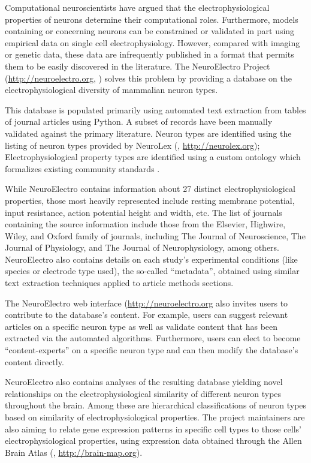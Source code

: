 \documentclass[12pt]{article}
\begin{document}
Computational neuroscientists have argued that the electrophysiological properties of neurons determine their computational roles.
Furthermore, models containing or concerning neurons can be constrained or validated in part using empirical data on single cell electrophysiology.
However, compared with imaging or genetic data, these data are infrequently published in a format that permits them to be easily discovered in the literature.
The NeuroElectro Project (\url{http://neuroelectro.org}, \cite{neuroelectro_2013}) solves this problem by providing a database on the electrophysiological diversity of mammalian neuron types.

This database is populated primarily using automated text extraction from tables of journal articles using Python.
A subset of records have been manually validated against the primary literature.
Neuron types are identified using the listing of neuron types provided by NeuroLex (\cite{larson_neurolex.org:_2013,hamilton_ontological_2012}, \url{http://neurolex.org});
Electrophysiological property types are identified using a custom ontology which formalizes existing community standards \cite{ascoli_petilla_2008}.

While NeuroElectro contains information about 27 distinct electrophysiological properties, those most heavily represented include resting membrane potential, input resistance, action potential height and width, etc.
The list of journals containing the source information include those from the Elsevier, Highwire, Wiley, and Oxford family of journals, including The Journal of Neuroscience, The Journal of Physiology, and The Journal of Neurophysiology, among others.
NeuroElectro also contains details on each study’s experimental conditions (like species or electrode type used), the so-called ``metadata'', obtained using similar text extraction techniques applied to article methods sections.

The NeuroElectro web interface (\url{http://neuroelectro.org} also invites users to contribute to the database’s content.
For example, users can suggest relevant articles on a specific neuron type as well as validate content that has been extracted via the automated algorithms.
Furthermore, users can elect to become ``content-experts” on a specific neuron type and can then modify the database’s content directly.

NeuroElectro also contains analyses of the resulting database yielding novel relationships on the electrophysiological similarity of different neuron types throughout the brain.
Among these are hierarchical classifications of neuron types based on similarity of electrophysiological properties.
The project maintainers are also aiming to relate gene expression patterns in specific cell types to those cells' electrophysiological properties, using expression data obtained through the Allen Brain Atlas (\cite{lein_genome-wide_2007}, \url{http://brain-map.org}).


\end{document}
